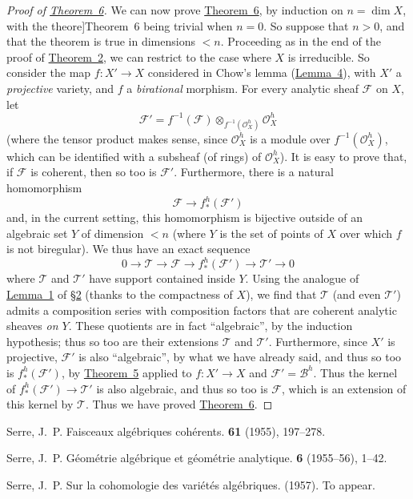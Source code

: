 \documentclass{article}
\newcommand{\scr}[1]{{\mathscr{#1}}}
\newcommand{\oldpage}[1]{\marginpar{\footnotesize$\Big\vert$ \textit{p.~#1}}}
\begin{document}
\begin{proof}[Proof of {\hyperref[theorem6]{Theorem~6}}]
  We can now prove \hyperref[theorem6]{Theorem~6}, by induction on $n=\dim X$, with the theore]{Theorem~6} being trivial when $n=0$.
  So suppose that $n>0$, and that the theorem is true in dimensions $<n$.
  Proceeding as in the end of the proof of \hyperref[theorem2]{Theorem~2}, we can restrict to the case where $X$ is irreducible.
  So consider the map $f\colon X'\to X$ considered in Chow's lemma (\hyperref[lemma4]{Lemma~4}), with $X'$ a \emph{projective} variety, and $f$ a \emph{birational} morphism.
  For every analytic sheaf $\scr{F}$ on $X$, let
  \[
    \scr{F}' = f^{-1}(\scr{F})\otimes_{f^{-1}(\scr{O}_X^h)}\scr{O}_X^h
  \]
  (where the tensor product makes sense, since $\scr{O}_X^h$ is a module over $f^{-1}(\scr{O}_X^h)$, which can be identified with a subsheaf (of rings) of $\scr{O}_X^h$).
  It is easy to prove that, if $\scr{F}$ is coherent, then so too is $\scr{F}'$.
  Furthermore, there is a natural homomorphism
  \oldpage{2-16}
  \[
    \scr{F} \to f_*^h(\scr{F}')
  \]
  and, in the current setting, this homomorphism is bijective outside of an algebraic set $Y$ of dimension $<n$ (where $Y$ is the set of points of $X$ over which $f$ is not biregular).
  We thus have an exact sequence
  \[
    0 \to \scr{T} \to \scr{F} \to f_*^h(\scr{F}') \to \scr{T}' \to 0
  \]
  where $\scr{T}$ and $\scr{T'}$ have support contained inside $Y$.
  Using the analogue of \hyperref[lemma1]{Lemma~1} of \hyperref[section2]{\S2} (thanks to the compactness of $X$), we find that $\scr{T}$ (and even $\scr{T}'$) admits a composition series with composition factors that are coherent analytic sheaves \emph{on $Y$}.
  These quotients are in fact ``algebraic'', by the induction hypothesis;
  thus so too are their extensions $\scr{T}$ and $\scr{T}'$.
  Furthermore, since $X'$ is projective, $\scr{F}'$ is also ``algebraic'', by what we have already said, and thus so too is $f_*^h(\scr{F}')$, by \hyperref[theorem5]{Theorem~5} applied to $f\colon X'\to X$ and $\scr{F}'=\scr{B}^h$.
  Thus the kernel of $f_*^h(\scr{F}')\to\scr{T}'$ is also algebraic, and thus so too is $\scr{F}$, which is an extension of this kernel by $\scr{T}$.
  Thus we have proved \hyperref[theorem6]{Theorem~6}.
\end{proof}



\nocite{*}

\begin{thebibliography}{3}

  {\sc Serre, J.~P.}
  \newblock Faisceaux alg\'{e}briques coh\'{e}rents.
   \textbf{61} (1955), 197--278.

  {\sc Serre, J.~P.}
  \newblock G\'{e}om\'{e}trie alg\'{e}brique et g\'{e}om\'{e}trie analytique.
   \textbf{6} (1955--56), 1--42.

  {\sc Serre, J.~P.}
  \newblock Sur la cohomologie des vari\'{e}t\'{e}s alg\'{e}briques.
   (1957).
  \newblock To appear.

\end{thebibliography}
\end{document}
